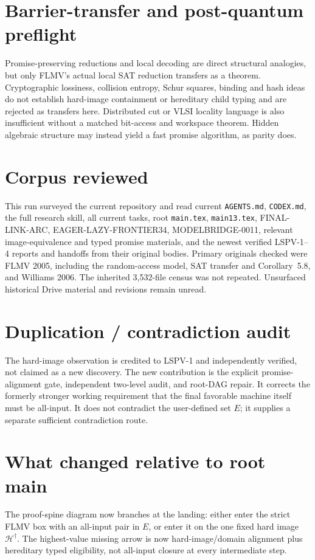 \documentclass[11pt]{article}
\begin{document}
\section{Barrier-transfer and post-quantum preflight}
Promise-preserving reductions and local decoding are direct structural
analogies, but only FLMV's actual local SAT reduction transfers as a theorem.
Cryptographic lossiness, collision entropy, Schur squares, binding and hash
ideas do not establish hard-image containment or hereditary child typing and
are rejected as transfers here.  Distributed cut or VLSI locality language is
also insufficient without a matched bit-access and workspace theorem.  Hidden
algebraic structure may instead yield a fast promise algorithm, as parity does.

\section{Corpus reviewed}
This run surveyed the current repository and read current \texttt{AGENTS.md},
\texttt{CODEX.md}, the full research skill, all current tasks, root
\texttt{main.tex}, \texttt{main13.tex}, FINAL-LINK-ARC,
EAGER-LAZY-FRONTIER34, MODELBRIDGE-0011, relevant image-equivalence and typed
promise materials, and the newest verified LSPV-1--4 reports and handoffs from
their original bodies.  Primary originals checked were FLMV 2005, including
the random-access model, SAT transfer and Corollary~5.8, and Williams 2006.
The inherited 3,532-file census was not repeated.  Unsurfaced historical Drive
material and revisions remain unread.

\section{Duplication / contradiction audit}
The hard-image observation is credited to LSPV-1 and independently verified,
not claimed as a new discovery.  The new contribution is the explicit
promise-alignment gate, independent two-level audit, and root-DAG repair.  It
corrects the formerly stronger working requirement that the final favorable
machine itself must be all-input.  It does not contradict the user-defined
set $E$; it supplies a separate sufficient contradiction route.

\section{What changed relative to root main}
The proof-spine diagram now branches at the landing: either enter the strict
FLMV box with an all-input pair in $E$, or enter it on the one fixed hard image
$\mathcal H^\dagger$.  The highest-value missing arrow is now hard-image/domain
alignment plus hereditary typed eligibility, not all-input closure at every
intermediate step.
\end{document}

